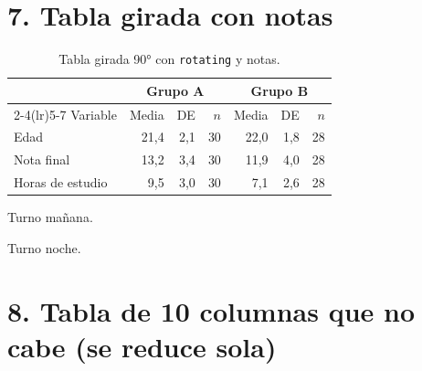 \documentclass[11pt,a4paper]{article}
\begin{document}
\section*{7. Tabla girada con notas}
\begin{table}
\centering
\begin{threeparttable}
\caption{Tabla girada 90° con \texttt{rotating} y notas.}
\begin{tabular}{lrrrrrr}
  \toprule
  & \multicolumn{3}{c}{Grupo A\tnote{1}} & \multicolumn{3}{c}{Grupo B\tnote{2}}\\
  \cmidrule(lr){2-4}\cmidrule(lr){5-7}
  Variable & Media & DE & $n$ & Media & DE & $n$\\
  \midrule
  Edad & 21,4 & 2,1 & 30 & 22,0 & 1,8 & 28\\
  Nota final & 13,2 & 3,4 & 30 & 11,9 & 4,0 & 28\\
  Horas de estudio & 9,5 & 3,0 & 30 & 7,1 & 2,6 & 28\\
  \bottomrule
\end{tabular}
\begin{tablenotes}\small
  \item[1] Turno mañana. \item[2] Turno noche.
\end{tablenotes}
\end{threeparttable}
\end{table}

\section*{8. Tabla de 10 columnas que no cabe (se reduce sola)}
\noindent{}
\end{document}
